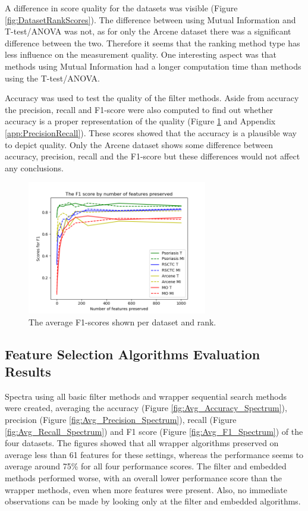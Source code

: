 \documentclass[10pt,a4paper]{article}
\begin{document}
	A difference in score quality for the datasets was visible (Figure \ref{fig:DatasetRankScores}). The difference between using Mutual Information and T-test/ANOVA was not, as for only the Arcene dataset there was a significant difference between the two. Therefore it seems that the ranking method type has less influence on the measurement quality. One interesting aspect was that methods using Mutual Information had a longer computation time than methods using the T-test/ANOVA.
	
	Accuracy was used to test the quality of the filter methods. Aside from accuracy the precision, recall and F1-score were also computed to find out whether accuracy is a proper representation of the quality (Figure \ref{fig:DatasetRankF1Scores} and Appendix \ref{app:PrecisionRecall}). These scores showed that the accuracy is a plausible way to depict quality. Only the Arcene dataset shows some difference between accuracy, precision, recall and the F1-score but these differences would not affect any conclusions.
	
	\begin{figure}[H]
		\includegraphics[width=0.7\textwidth]{Data_Rank_F1_Scores.png}
		\caption{The average F1-scores shown per dataset and rank.}
		\label{fig:DatasetRankF1Scores}
	\end{figure}
	
	\subsection{Feature Selection Algorithms Evaluation Results}
	\label{subsec:FeatureSelectionAlgorithmsEvaluationResults}
	
	Spectra using all basic filter methods and wrapper sequential search methods were created, averaging the accuracy (Figure \ref{fig:Avg_Accuracy_Spectrum}), precision (Figure \ref{fig:Avg_Precision_Spectrum}), recall (Figure \ref{fig:Avg_Recall_Spectrum}) and F1 score (Figure \ref{fig:Avg_F1_Spectrum}) of the four datasets. The figures showed that all wrapper algorithms preserved on average less than 61 features for these settings, whereas the performance seems to average around 75\% for all four performance scores. The filter and embedded methods performed worse, with an overall lower performance score than the wrapper methods, even when more features were present. Also, no immediate observations can be made by looking only at the filter and embedded algorithms.
	
\end{document}
